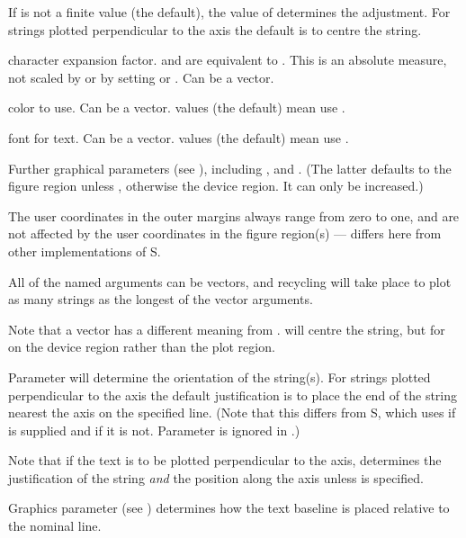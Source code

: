\begin{Arguments}
\begin{ldescription}
If  is not a finite value (the default), the value of
 determines the adjustment.  For strings plotted
perpendicular to the axis the default is to centre the string.
\item[\code{cex}] character expansion factor.   and 
are equivalent to .  This is an absolute measure, not
scaled by  or by setting 
or .  Can be a vector.
\item[\code{col}] color to use.  Can be a vector.   values (the
default) mean use .
\item[\code{font}] font for text.  Can be a vector.   values (the
default) mean use .
\item[\code{...}] Further graphical parameters (see ),
including ,  and . (The latter
defaults to the figure region unless , otherwise
the device region.  It can only be increased.)
\end{ldescription}
\end{Arguments}
%
\begin{Details}\relax
The user coordinates in the outer margins always range from zero to
one, and are not affected by the user coordinates in the figure
region(s) --- \R{} differs here from other implementations of S.

All of the named arguments can be vectors, and recycling will take
place to plot as many strings as the longest of the vector arguments.

Note that a vector  has a different meaning from
.   will centre the string, but for
 on the device region rather than the plot region.

Parameter  will determine the orientation of the string(s).
For strings plotted perpendicular to the axis the default justification
is to place the end of the string nearest the axis on the specified
line.  (Note that this differs from S, which uses  if
 is supplied and  if it is not.  Parameter
 is ignored in \R{}.)

Note that if the text is to be plotted perpendicular to the axis,
 determines the justification of the string \emph{and} the
position along the axis unless  is specified.

Graphics parameter  (see ) determines
how the text baseline is placed relative to the nominal line.
\end{Details}
